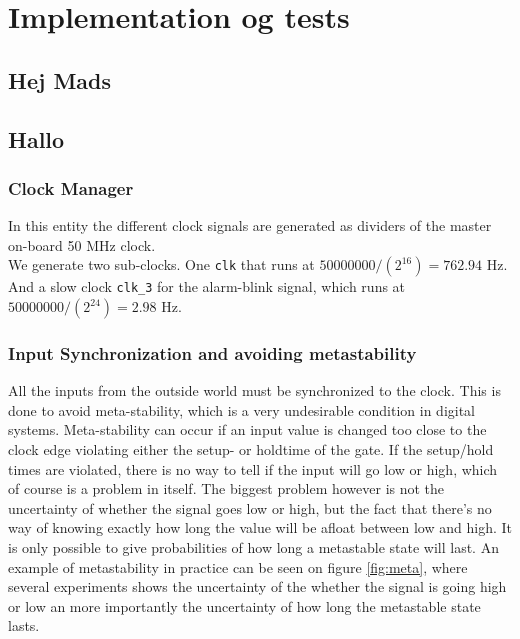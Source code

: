 \chapter{Implementation og tests}
\section{Hej Mads}
\section{Hallo}

\subsection{Clock Manager}
In this entity the different clock signals are generated as dividers of the master on-board 50 MHz clock. \\ 
We generate two sub-clocks. One \texttt{clk} that runs at $50000000/(2^16) = 762.94$ Hz. And a slow clock \texttt{clk\_3} for the alarm-blink signal, which runs at $50000000/(2^24) = 2.98$ Hz.

\subsection{Input Synchronization and avoiding metastability}
All the inputs from the outside world must be synchronized to the clock. This is done to avoid meta-stability, which is a very undesirable condition in digital systems. Meta-stability can occur if an input value is changed too close to the clock edge violating either the setup- or holdtime of the gate. If the setup/hold times are violated, there is no way to tell if the input will go low or high, which of course is a problem in itself. The biggest problem however is not the uncertainty of whether the signal goes low or high, but the fact that there's no way of knowing exactly how long the value will be afloat between low and high. It is only possible to give probabilities of how long a metastable state will last. An example of metastability in practice can be seen on figure \ref{fig:meta}, where several experiments shows the uncertainty of the whether the signal is going high or low an more importantly the uncertainty of how long the metastable state lasts.\\

